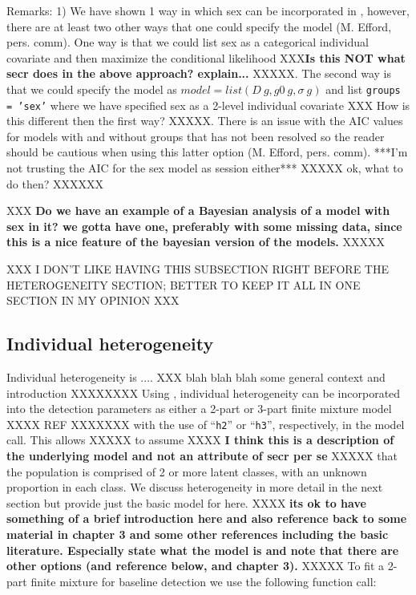 Remarks: 1) We have shown 1 way in which sex can be incorporated in
\secr, however, there are at least two other ways that one could
specify the model (M. Efford, pers. comm).  One way is that we could
list sex as a categorical individual covariate and then maximize the
conditional likelihood XXX{\bf Is this NOT what secr does in the above
  approach? explain...} XXXXX.  The second way is that we could specify the
model as $model = list(D~g, g0~g, \sigma~g)$ and list \mbox{\tt groups = 'sex'}
where we have specified sex as a 2-level individual covariate XXX How
is this different then the first way? XXXXX.  There
is an issue with the AIC values for models with and without groups
that has not been resolved so the reader should be cautious when using
this latter option (M. Efford, pers. comm).  ***I'm not trusting the
AIC for the sex model as session either*** XXXXX ok, what to do then? XXXXXX


XXX
{\bf Do we have an example of a Bayesian analysis of a model with sex in it?
we gotta have one, preferably with some missing data, since this is a
nice feature of the bayesian version of the models. }
XXXXX

XXX I DON'T LIKE HAVING THIS SUBSECTION RIGHT BEFORE THE HETEROGENEITY SECTION; BETTER TO KEEP IT ALL IN ONE SECTION IN MY OPINION XXX
\subsection{Individual heterogeneity}

Individual heterogeneity is .... XXX blah blah blah some general
context and introduction XXXXXXXX
Using \secr,  individual heterogeneity can be incorporated
into the detection parameters as either a 2-part or 3-part finite
mixture model XXXX REF XXXXXXX with the use of ``\mbox{\tt h2}'' or
``\mbox{\tt h3}'', respectively, in the
model call.   This allows  XXXXX to assume  XXXX
{\bf I
think this is a description of the underlying model and not an
attribute of secr per se} XXXXX that the population is
comprised of 2 or more latent classes, with an unknown proportion in
each class.  We discuss heterogeneity in more detail in the next
section but provide just the basic model for \secr here.
XXXX
{\bf its ok
to have something of a brief introduction here and also reference back
to some material in chapter 3 and some other references including the
basic literature. Especially state what the model is and note that
there are other options (and reference below, and chapter 3). }
XXXXX
To fit a
2-part finite mixture for baseline detection we use the following
function call:


